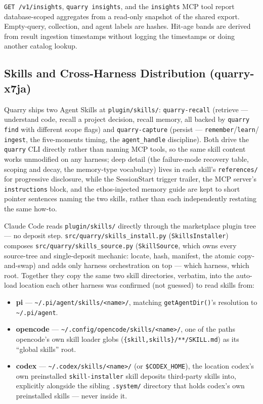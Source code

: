 \documentclass[a4paper,10pt]{article}
\newcommand{\modpath}[1]{\texttt{src/quarry/#1}}
\begin{document}
\texttt{GET /v1/insights}, \texttt{quarry insights}, and the \texttt{insights}
MCP tool report database-scoped aggregates from a read-only snapshot of the
shared export. Empty-query, collection, and agent labels are hashes. Hit-age
bands are derived from result ingestion timestamps without logging the
timestamps or doing another catalog lookup.

\subsection{Skills and Cross-Harness Distribution (quarry-x7ja)}

Quarry ships two Agent Skills at \texttt{plugin/skills/}: \texttt{quarry-recall}
(retrieve --- understand code, recall a project decision, recall memory, all
backed by \texttt{quarry find} with different scope flags) and
\texttt{quarry-capture} (persist --- \texttt{remember}/\texttt{learn}/
\texttt{ingest}, the five-moments timing, the \texttt{agent\_handle}
discipline).  Both drive the \texttt{quarry} CLI directly rather than naming
MCP tools, so the same skill content works unmodified on any harness; deep
detail (the failure-mode recovery table, scoping and decay, the memory-type
vocabulary) lives in each skill's \texttt{references/} for progressive
disclosure, while the SessionStart trigger trailer, the MCP server's
\texttt{instructions} block, and the ethos-injected memory guide are kept to
short pointer sentences naming the two skills, rather than each independently
restating the same how-to.

Claude Code reads \texttt{plugin/skills/} directly through the marketplace
plugin tree --- no deposit step.  \modpath{skills\_install.py}
(\texttt{SkillsInstaller}) composes \modpath{skills\_source.py}
(\texttt{SkillSource}, which owns every source-tree and single-deposit
mechanic: locate, hash, manifest, the atomic copy-and-swap) and adds only
harness orchestration on top --- which harness, which root. Together they
copy the same two skill directories, verbatim, into the auto-load location
each other harness was confirmed (not guessed) to read skills from:

\begin{itemize}
  \item \textbf{pi} --- \texttt{\textasciitilde{}/.pi/agent/skills/<name>/}, matching
    \texttt{getAgentDir()}'s resolution to \texttt{\textasciitilde{}/.pi/agent}.
  \item \textbf{opencode} ---
    \texttt{\textasciitilde{}/.config/opencode/skills/<name>/},
    one of the paths opencode's own skill loader globs
    (\texttt{\{skill,skills\}/**/SKILL.md}) as its ``global skills'' root.
  \item \textbf{codex} --- \texttt{\textasciitilde{}/.codex/skills/<name>/} (or
    \texttt{\$CODEX\_HOME}), the location codex's own preinstalled
    \texttt{skill-installer} skill deposits third-party skills into,
    explicitly alongside the sibling \texttt{.system/} directory that holds
    codex's own preinstalled skills --- never inside it.
\end{itemize}
\end{document}
